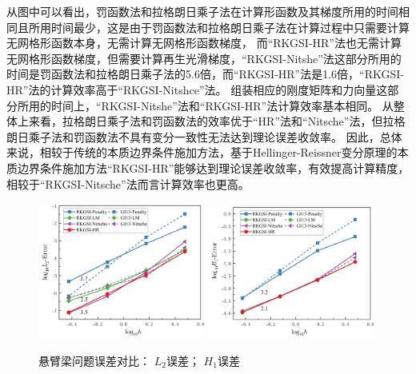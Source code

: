 从图中可以看出，罚函数法和拉格朗日乘子法在计算形函数及其梯度所用的时间相同且所用时间最少，这是由于罚函数法和拉格朗日乘子法在计算过程中只需要计算无网格形函数本身，无需计算无网格形函数梯度，
而“RKGSI-HR”法也无需计算无网格形函数梯度，但需要计算再生光滑梯度，“RKGSI-Nitshe”法这部分所用的时间是罚函数法和拉格朗日乘子法的5.6倍，而“RKGSI-HR”法是1.6倍，“RKGSI-HR”法的计算效率高于“RKGSI-Nitshce”法。
组装相应的刚度矩阵和力向量这部分所用的时间上，“RKGSI-Nitshe”法和“RKGSI-HR”法计算效率基本相同。
从整体上来看，拉格朗日乘子法和罚函数法的效率优于“HR”法和“Nitsche”法，但拉格朗日乘子法和罚函数法不具有变分一致性无法达到理论误差收敛率。
因此，总体来说，相较于传统的本质边界条件施加方法，基于Hellinger-Reissner变分原理的本质边界条件施加方法“RKGSI-HR”能够达到理论误差收敛率，有效提高计算精度，相较于“RKGSI-Nitsche”法而言计算效率也更高。
\begin{figure}[H]
\centering
\begin{subcaptiongroup}
    \includegraphics[width=0.49\textwidth]{figure/EHR/cantilever/L2.png}
    \label{CL2}
    \includegraphics[width=0.49\textwidth]{figure/EHR/cantilever/H1.png}
    \label{CH1}
    \end{subcaptiongroup}
\caption{悬臂梁问题误差对比： $L_2$误差； $H_1$误差}
\end{figure}
\newpage
